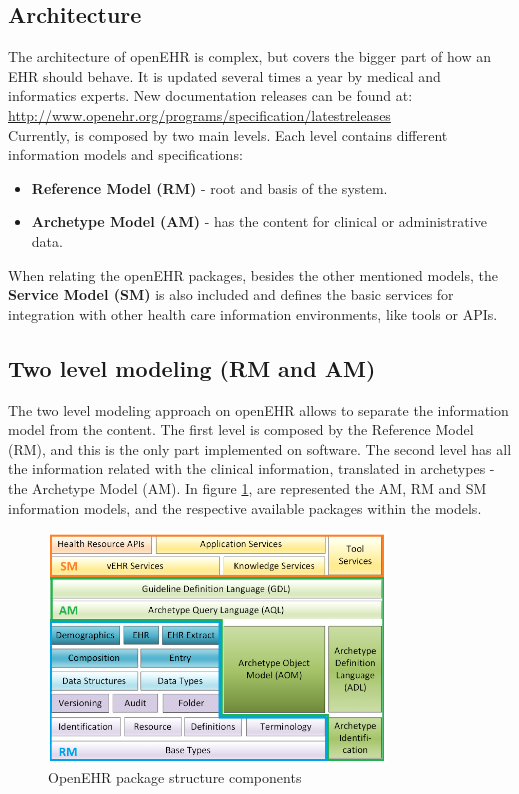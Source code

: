 \documentclass[mim_thesis.tex]{subfiles}
\begin{document}
\subsection{Architecture}
The architecture of openEHR is complex, but covers the bigger part of how an EHR should behave. It is updated several times a year by medical and informatics experts. New documentation releases can be found at: \url{http://www.openehr.org/programs/specification/latestreleases} \\

Currently, is composed by two main levels. Each level contains different information models and specifications:
\begin{itemize}[noitemsep]
\item \textbf{Reference Model (RM)} - root and basis of the system.
\item \textbf{Archetype Model (AM)} - has the content for clinical or administrative data.
\end{itemize}
When relating the openEHR packages, besides the other mentioned models, the \textbf{Service Model (SM)} is also included and defines the basic services for integration with other health care information environments, like tools or APIs. 


\subsection{Two level modeling (RM and AM)}
The two level modeling approach on openEHR allows to separate the information model from the content. The first level is composed by the Reference Model (RM), and this is the only part implemented on software. The second level has all the information related with the clinical information, translated in archetypes - the Archetype Model (AM). In figure \ref{fig:openehr_components}, are represented the AM, RM and SM information models, and the respective available packages within the models. 

\begin{figure}[H]
	\centering
    \includegraphics[width=0.8\textwidth]{img/openehr_components.PNG}
	\caption{OpenEHR package structure components}
	\label{fig:openehr_components}
\end{figure}
\end{document}
